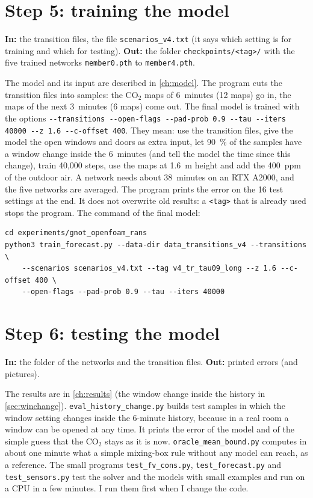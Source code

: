 \section{Step 5: training the model}
\textbf{In:} the transition files, the file \texttt{scenarios\_v4.txt} (it says which setting is for training and which for
testing). \textbf{Out:} the folder \texttt{checkpoints/<tag>/} with the five trained networks \texttt{member0.pth} to \texttt{member4.pth}.

The model and its input are described in \cref{ch:model}. The program cuts the transition files into samples: the CO$_2$ maps of 6~minutes (12 maps) go in, the maps of the next
3~minutes (6 maps) come out. The final model is trained with the options \texttt{-{}-transitions -{}-open-flags -{}-pad-prob 0.9
-{}-tau -{}-iters 40000 -{}-z 1.6 -{}-c-offset 400}. They mean: use the transition files, give the model the open windows and
doors as extra input, let 90~\% of the samples have a window change inside the 6~minutes (and tell the model the time since
this change), train 40,000 steps, use the maps at 1.6~m height and add the 400~ppm of the outdoor air. A network needs about
38~minutes on an RTX A2000, and the five networks are averaged. The program prints the error on the 16 test settings at the
end. It does not overwrite old results: a \texttt{<tag>} that is already used stops the program. The command of the final model:

\begin{lstlisting}[breaklines=true,postbreak=\space]
cd experiments/gnot_openfoam_rans
python3 train_forecast.py --data-dir data_transitions_v4 --transitions \
    --scenarios scenarios_v4.txt --tag v4_tr_tau09_long --z 1.6 --c-offset 400 \
    --open-flags --pad-prob 0.9 --tau --iters 40000
\end{lstlisting}


\section{Step 6: testing the model}
\textbf{In:} the folder of the networks and the transition files. \textbf{Out:} printed errors (and pictures).

The results are in \cref{ch:results} (the window change inside the history in \cref{sec:winchange}).
\texttt{eval\_history\_change.py} builds test samples in which the window setting changes inside the 6-minute history, because
in a real room a window can be opened at any time. It prints the error of the model and of the simple guess that the CO$_2$ stays as
it is now. \texttt{oracle\_mean\_bound.py} computes in about one minute what a simple mixing-box rule without any model can
reach, as a reference. The small programs \texttt{test\_fv\_cons.py}, \texttt{test\_forecast.py} and \texttt{test\_sensors.py}
test the solver and the models with small examples and run on a CPU in a few minutes. I run them first when I change the code.

